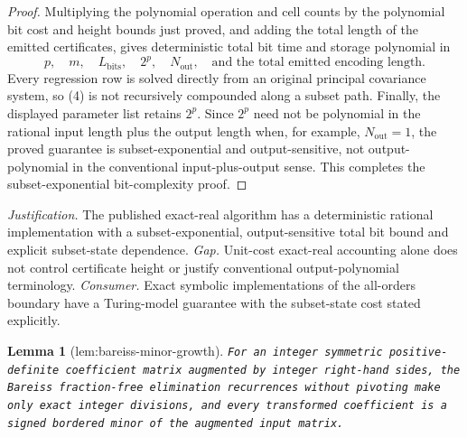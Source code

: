 \documentclass{article}
\newtheorem{lemma}{Lemma}
\begin{document}
\begin{proof}
Multiplying the polynomial operation and cell counts by the polynomial bit cost and height bounds just proved, and adding the total length of the emitted certificates, gives deterministic total bit time and storage polynomial in
\[
 p,\quad m,\quad L_{\mathrm{bits}},\quad 2^p,
 \quad N_{\mathrm{out}},\quad
 \text{and the total emitted encoding length}.
\]
Every regression row is solved directly from an original principal covariance system, so (4) is not recursively compounded along a subset path.  Finally, the displayed parameter list retains \(2^p\).  Since \(2^p\) need not be polynomial in the rational input length plus the output length when, for example, \(N_{\mathrm{out}}=1\), the proved guarantee is subset-exponential and output-sensitive, not output-polynomial in the conventional input-plus-output sense.
This completes the subset-exponential bit-complexity proof.
\end{proof}
\par\smallskip\noindent \textit{Justification.} The published exact-real algorithm has a deterministic rational implementation with a subset-exponential, output-sensitive total bit bound and explicit subset-state dependence. \textit{Gap.} Unit-cost exact-real accounting alone does not control certificate height or justify conventional output-polynomial terminology. \textit{Consumer.} Exact symbolic implementations of the all-orders boundary have a Turing-model guarantee with the subset-state cost stated explicitly.

\begin{lemma}[lem:bareiss-minor-growth]\label{lem:bareiss-minor-growth}
\texttt{For an integer symmetric positive-\allowbreak{}definite coefficient matrix augmented by
integer right-\allowbreak{}hand sides,\allowbreak{} the Bareiss fraction-\allowbreak{}free elimination recurrences
without pivoting make only exact integer divisions,\allowbreak{} and every transformed
coefficient is a signed bordered minor of the augmented input matrix.}
\end{lemma}
\end{document}
